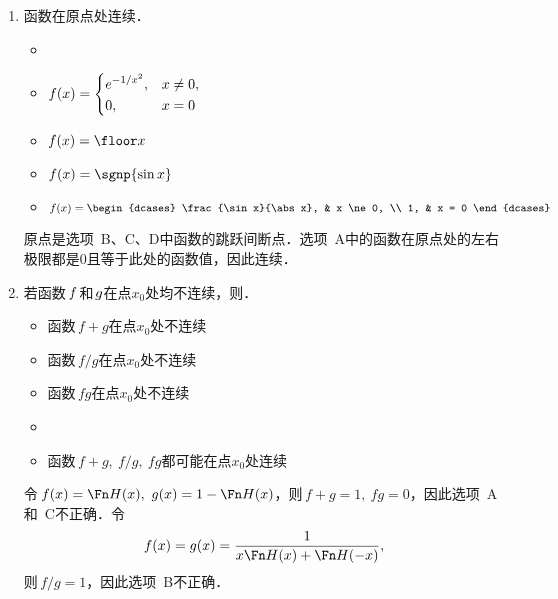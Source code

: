 \begin{enumerate}
\item 函数\uline{\makebox[10em]{}}在原点处连续．
  \begin{itemize}
    \renewcommand{\labelitemi}{\faCircleThin}
    \ifshowsol
  \item[\faCircle]
    \else
  \item
    \fi
    \begin{math}
      f(x) =
      \begin{dcases}
        e^{-1/x^2}, & x \ne 0, \\
        0, & x = 0
      \end{dcases}
    \end{math}
  \item \(f(x) = \floor x\)
  \item \(f(x) = \sgnp{\sin x}\)
  \item
    \begin{math}
      f(x) =
      \begin{dcases}
        \frac{\sin x}{\abs x}, & x \ne 0, \\
        1, & x = 0
      \end{dcases}
    \end{math}\rule{0ex}{5ex}
  \end{itemize}

  \ifshowsol
  原点是选项~B、C、D中函数的跳跃间断点．选项~A中的函数在原点处的左右极限都是\(0\)且等于此处的函数值，因此连续．
  \fi

\item 若函数\(\,f\mkern2mu\)和\(\mkern2mu g\)在点\(x_0\)处均不连续，则\uline{\makebox[10em]{}}．
  \begin{itemize}
    \renewcommand{\labelitemi}{\faCircleThin}
  \item 函数\(\,f+g\)在点\(x_0\)处不连续
  \item 函数\(\,f/g\)在点\(x_0\)处不连续
  \item 函数\(\,fg\)在点\(x_0\)处不连续
    \ifshowsol
  \item[\faCircle]
    \else
  \item
    \fi
    函数\(\,f+g,\ f/g,\ fg\)都可能在点\(x_0\)处连续
  \end{itemize}

  \ifshowsol
  令\(\,f(x) = \Fn H(x),\ g(x) = 1-\Fn H(x)\)，则\(\,f + g = 1,\ fg = 0\)，因此选项~A和~C不正确．令
  \begin{equation*}
    f(x) = g(x) = \frac{1}{x \Fn H(x) + \Fn H(-x)},
  \end{equation*}
  则\(\,f/g = 1\)，因此选项~B不正确．
  \fi
\end{enumerate}
\fi

